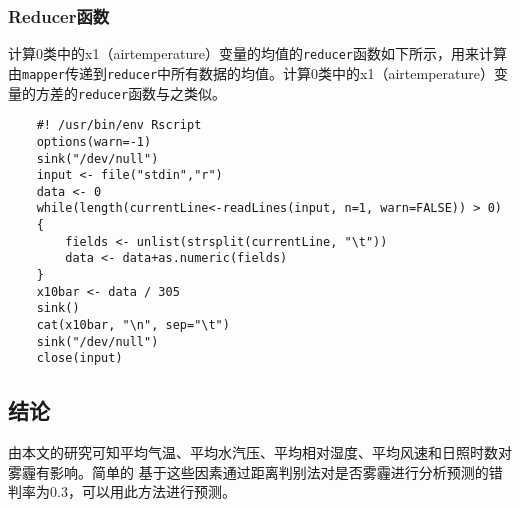 \subsubsection{Reducer函数}\label{reducerux51fdux6570}

计算0类中的x1（airtemperature）变量的均值的\lstinline!reducer!函数如下所示，用来计算由\lstinline!mapper!传递到\lstinline!reducer!中所有数据的均值。计算0类中的x1（airtemperature）变量的方差的\lstinline|reducer|函数与之类似。

\begin{lstlisting}
	#! /usr/bin/env Rscript
	options(warn=-1)
	sink("/dev/null")
	input <- file("stdin","r")
	data <- 0
	while(length(currentLine<-readLines(input, n=1, warn=FALSE)) > 0)
	{
	    fields <- unlist(strsplit(currentLine, "\t"))
	    data <- data+as.numeric(fields)
	}
	x10bar <- data / 305
	sink()
	cat(x10bar, "\n", sep="\t")
	sink("/dev/null")
	close(input)
\end{lstlisting}

\subsection{结论}\label{ux7ed3ux8bba}

由本文的研究可知平均气温、平均水汽压、平均相对湿度、平均风速和日照时数对雾霾有影响。简单的
基于这些因素通过距离判别法对是否雾霾进行分析预测的错判率为0.3，可以用此方法进行预测。
